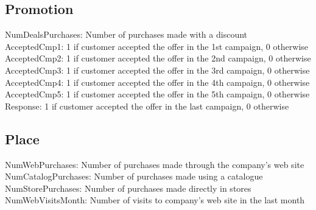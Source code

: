 \documentclass[12pt,a4paper]{report}
\begin{document}
\subsection{Promotion}
\begin{itemize}
\vspace{0.2cm}
NumDealsPurchases: Number of purchases made with a discount\\
\vspace{0.2cm}
AcceptedCmp1: 1 if customer accepted the offer in the 1st campaign, 0 otherwise\\
\vspace{0.2cm}
AcceptedCmp2: 1 if customer accepted the offer in the 2nd campaign, 0 otherwise\\
\vspace{0.2cm}
AcceptedCmp3: 1 if customer accepted the offer in the 3rd campaign, 0 otherwise\\
\vspace{0.2cm}
AcceptedCmp4: 1 if customer accepted the offer in the 4th campaign, 0 otherwise\\
\vspace{0.2cm}
AcceptedCmp5: 1 if customer accepted the offer in the 5th campaign, 0 otherwise\\
\vspace{0.2cm}
Response: 1 if customer accepted the offer in the last campaign, 0 otherwise\\
\vspace{0.2cm}

\end{itemize}

\subsection{Place}

\begin{itemize}
\vspace{0.2cm}
NumWebPurchases: Number of purchases made through the company’s web site\\
\vspace{0.2cm}
NumCatalogPurchases: Number of purchases made using a catalogue\\
\vspace{0.2cm}
NumStorePurchases: Number of purchases made directly in stores\\
\vspace{0.2cm}
NumWebVisitsMonth: Number of visits to company’s web site in the last month\\
\vspace{0.2cm}


\end{itemize}
\end{document}
